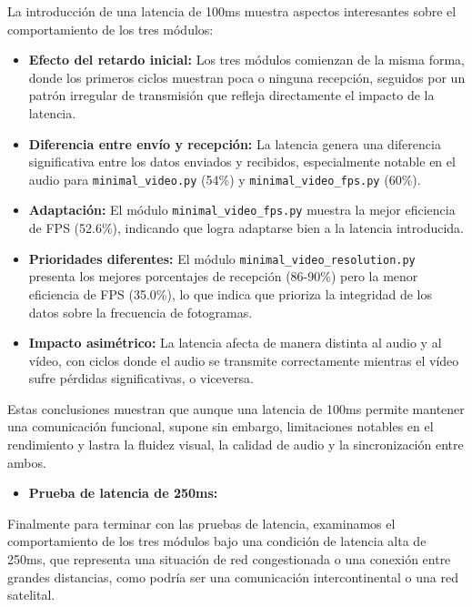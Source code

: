 La introducción de una latencia de 100ms muestra aspectos interesantes sobre el comportamiento de los tres módulos:

\begin{itemize}
    \item \textbf{Efecto del retardo inicial:} Los tres módulos comienzan de la misma forma, donde los primeros ciclos muestran poca o ninguna recepción, seguidos por un patrón irregular de transmisión que refleja directamente el impacto de la latencia.
    
    \item \textbf{Diferencia entre envío y recepción:} La latencia genera una diferencia significativa entre los datos enviados y recibidos, especialmente notable en el audio para \texttt{minimal\_video.py} (54\%) y \texttt{minimal\_video\_fps.py} (60\%).
    
    \item \textbf{Adaptación:} El módulo \texttt{minimal\_video\_fps.py} muestra la mejor eficiencia de FPS (52.6\%), indicando que logra adaptarse bien a la latencia introducida.
    
    \item \textbf{Prioridades diferentes:} El módulo \texttt{minimal\_video\_resolution.py} presenta los mejores porcentajes de recepción (86-90\%) pero la menor eficiencia de FPS (35.0\%), lo que indica que prioriza la integridad de los datos sobre la frecuencia de fotogramas.
    
    \item \textbf{Impacto asimétrico:} La latencia afecta de manera distinta al audio y al vídeo, con ciclos donde el audio se transmite correctamente mientras el vídeo sufre pérdidas significativas, o viceversa.
\end{itemize}

Estas conclusiones muestran que aunque una latencia de 100ms permite mantener una comunicación funcional, supone sin embargo, limitaciones notables en el rendimiento y lastra la fluidez visual, la calidad de audio y la sincronización entre ambos.

\newpage

\begin{itemize}
  \item \textbf{Prueba de latencia de 250ms:}
\end{itemize}

Finalmente para terminar con las pruebas de latencia, examinamos el comportamiento de los tres módulos bajo una condición de latencia alta de 250ms, que representa una situación de red congestionada o una conexión entre grandes distancias, como podría ser una comunicación intercontinental o una red satelital.


